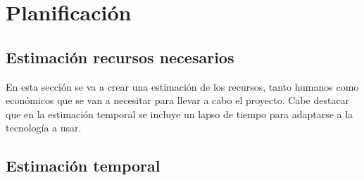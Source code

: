 \chapter {Planificación}

\section{Estimación recursos necesarios}
\begin{paragraph}
	En esta sección se va a crear una estimación de los recursos, tanto humanos como económicos que se van a necesitar para llevar a cabo el proyecto. Cabe destacar que en la estimación temporal se incluye un lapso de tiempo para adaptarse a la tecnología a usar. \\ 
	
\end{paragraph}
\section{Estimación temporal}